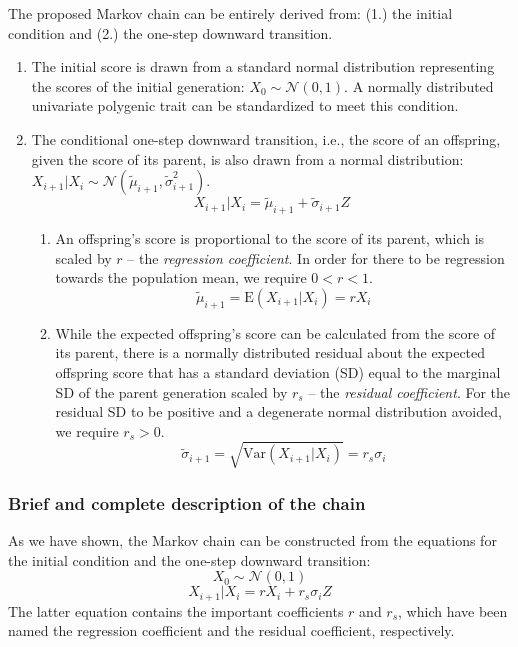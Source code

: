 \documentclass[letterpaper,10pt]{article} %
\begin{document}
The proposed Markov chain can be entirely derived from: (1.) the initial condition and (2.) the one-step downward transition. 

\begin{enumerate}
\item The initial score is drawn from a standard normal distribution representing the scores of the initial generation: $X_0 \sim \mathcal{N}(0, 1)$. A normally distributed univariate polygenic trait can be standardized to meet this condition. 

\item The conditional one-step downward transition, i.e., the score of an offspring, given the score of its parent, is also drawn from a normal distribution: $X_{i+1}|X_i \sim \mathcal{N}(\tilde{\mu}_{i+1}, \tilde{\sigma}_{i+1}^2)$.
$$X_{i+1}|X_i = \tilde{\mu}_{i+1} + \tilde{\sigma}_{i+1} Z$$ 

\begin{enumerate}
\item An offspring's score is proportional to the score of its parent, which is scaled by $r$ -- the \emph{regression coefficient}. In order for there to be regression towards the population mean, we require $0 < r < 1$. 
$$\tilde{\mu}_{i+1} = \mathrm{E}(X_{i+1}|X_i) = rX_i$$

\item While the expected offspring's score can be calculated from the score of its parent, there is a normally distributed residual about the expected offspring score that has a standard deviation (SD) equal to the marginal SD of the parent generation scaled by $r_s$ -- the \emph{residual coefficient}. For the residual SD to be positive and a degenerate normal distribution avoided, we require $r_s > 0$.
$$\tilde{\sigma}_{i+1} = \sqrt{\mathrm{Var}(X_{i+1}|X_i)} = r_s \sigma_i$$
\end{enumerate}
\end{enumerate}

\subsubsection{Brief and complete description of the chain}
As we have shown, the Markov chain can be constructed from the equations for the initial condition and the one-step downward transition:
$$X_0 \sim \mathcal{N}(0, 1)$$
$$X_{i+1}|X_i = rX_i+ r_s\sigma_iZ$$
The latter equation contains the important coefficients $r$ and $r_s$, which have been named the regression coefficient and the residual coefficient, respectively. 
\end{document}
